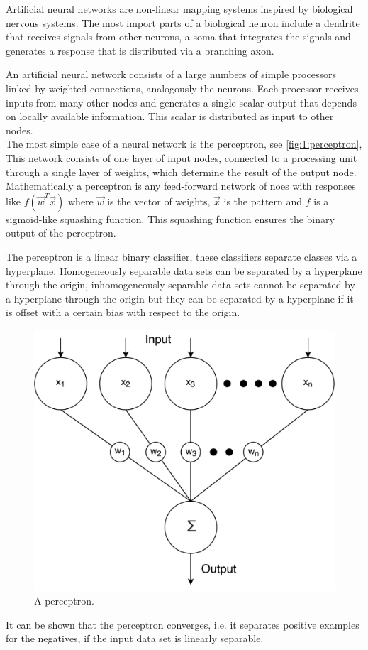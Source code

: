 Artificial neural networks are non-linear mapping systems inspired by biological nervous systems. The most import parts of a biological neuron include a dendrite that receives signals from other neurons, a soma that integrates the signals and generates a response that is distributed via a branching axon. 

An artificial neural network consists of a large numbers of simple processors linked by weighted connections, analogously the neurons. Each processor receives inputs from many other nodes and generates a single scalar output that depends on locally available information. This scalar is distributed as input to other nodes. \\

The most simple case of a neural network is the perceptron, see \autoref{fig:1:perceptron}, This network consists of one layer of input nodes, connected to a processing unit through a single layer of weights, which determine the result of the output node. Mathematically a perceptron is any feed-forward network of noes with responses like $f(\vec{w}^T\vec{x})$ where $\vec{w}$ is the vector of weights, $\vec{x}$ is the pattern and $f$ is a sigmoid-like squashing function\cite{reed1998neural}. This squashing function ensures the binary output of the perceptron. 

The perceptron is a linear binary classifier, these classifiers separate classes via a hyperplane. Homogeneously separable data sets can be separated by a hyperplane through the origin, inhomogeneously separable data sets cannot be separated by a hyperplane through the origin but they can be separated by a hyperplane if it is offset with a certain bias with respect to the origin. 

\begin{figure}[H]
	\centering
	\includegraphics[width=\columnwidth]{./img/perceptron}
	\caption{A perceptron.}
	\label{fig:1:perceptron}
\end{figure}

It can be shown that the perceptron converges, i.e. it separates positive examples for the negatives, if the input data set is linearly separable. 



